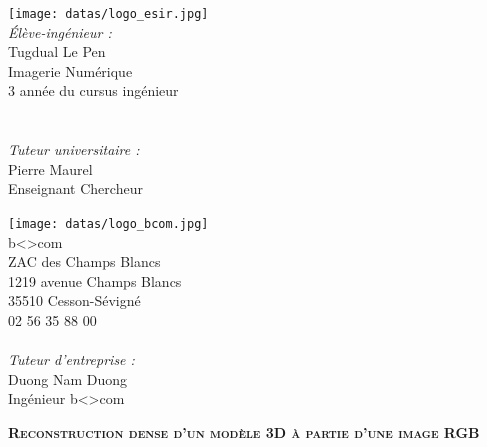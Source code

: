 \begin{titlepage}
  \begin{center}

    \begin{minipage}{0.45\textwidth}
      \begin{flushleft} \large
        \texttt{[image: datas/logo\_esir.jpg]}~\\
        \emph{Élève-ingénieur :}\\
        Tugdual Le Pen\\
        Imagerie Numérique\\
        3 année du cursus ingénieur\\
        ~\\~\\
        \emph{Tuteur universitaire :}\\
        Pierre Maurel\\
        Enseignant Chercheur
      \end{flushleft}
    \end{minipage}
    \begin{minipage}{0.45\textwidth}
      \begin{flushright} \large
        \vspace{34pt}
        \texttt{[image: datas/logo\_bcom.jpg]}~\\
        \vspace{29pt}
        b<>com\\
        ZAC des Champs Blancs\\
        1219 avenue Champs Blancs\\
        35510 Cesson-Sévigné\\
        02 56 35 88 00\\
        ~\\
        \emph{Tuteur d'entreprise :}\\
        Duong Nam Duong\\
        Ingénieur b<>com\\
      \end{flushright}
    \end{minipage}

    \vspace{4cm}

    \textsc{\Huge \textbf{Reconstruction dense d'un modèle 3D à partie d'une image RGB}}\\    

    \vfill


\end{center}
\end{titlepage}
